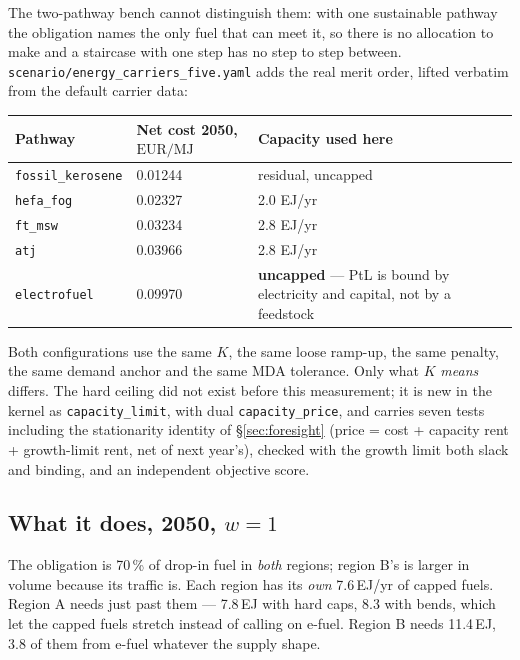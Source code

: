\documentclass[11pt,a4paper]{article}
\newcommand{\var}[1]{\texttt{\small #1}}
\newcommand{\EURMJ}{\ensuremath{\mathrm{EUR}/\mathrm{MJ}}}
\begin{document}
The two-pathway bench cannot distinguish them: with one sustainable pathway the obligation
names the only fuel that can meet it, so there is no allocation to make and a staircase
with one step has no step to step between. \var{scenario/energy\_carriers\_five.yaml} adds
the real merit order, lifted verbatim from the default carrier data:

\begin{table}[h]
\centering\small
\begin{tabular}{@{}llp{7.4cm}@{}}
\toprule
\textbf{Pathway} & \textbf{Net cost 2050, \EURMJ} & \textbf{Capacity used here} \\
\midrule
\var{fossil\_kerosene} & 0.01244 & residual, uncapped \\
\var{hefa\_fog} & 0.02327 & 2.0 EJ/yr \\
\var{ft\_msw} & 0.03234 & 2.8 EJ/yr \\
\var{atj} & 0.03966 & 2.8 EJ/yr \\
\var{electrofuel} & 0.09970 & \textbf{uncapped} --- PtL is bound by electricity and
  capital, not by a feedstock \\
\bottomrule
\end{tabular}
\end{table}

\noindent Both configurations use the same $K$, the same loose ramp-up, the same penalty,
the same demand anchor and the same MDA tolerance. Only what $K$ \emph{means} differs. The
hard ceiling did not exist before this measurement; it is new in the kernel as
\var{capacity\_limit}, with dual \var{capacity\_price}, and carries seven tests including
the stationarity identity of \S\ref{sec:foresight} (price = cost + capacity rent +
growth-limit rent, net of next year's), checked with the growth limit both slack and
binding, and an independent objective score.

\subsection{What it does, 2050, $w=1$}

\noindent The obligation is 70\,\% of drop-in fuel in \emph{both} regions; region B's is
larger in volume because its traffic is. Each region has its \emph{own} 7.6\,EJ/yr of
capped fuels. Region A needs just past them --- 7.8\,EJ with hard caps, 8.3 with bends,
which let the capped fuels stretch instead of calling on e-fuel. Region B needs 11.4\,EJ,
3.8 of them from e-fuel whatever the supply shape.
\end{document}
